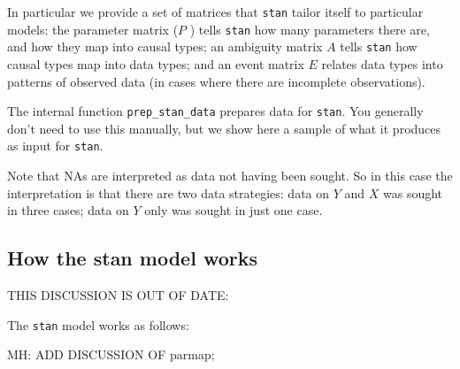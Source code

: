 \documentclass[
  article]{jss}
\begin{document}
In particular we provide a set of matrices that \texttt{stan} tailor
itself to particular models: the parameter matrix (\(P\) ) tells
\texttt{stan} how many parameters there are, and how they map into
causal types; an ambiguity matrix \(A\) tells \texttt{stan} how causal
types map into data types; and an event matrix \(E\) relates data types
into patterns of observed data (in cases where there are incomplete
observations).

The internal function \texttt{prep\_stan\_data} prepares data for
\texttt{stan}. You generally don't need to use this manually, but we
show here a sample of what it produces as input for \texttt{stan}.

Note that NAs are interpreted as data not having been sought. So in this
case the interpretation is that there are two data strategies: data on
\(Y\) and \(X\) was sought in three cases; data on \(Y\) only was sought
in just one case.

\hypertarget{how-the-stan-model-works}{%
\subsection{How the stan model works}\label{how-the-stan-model-works}}

THIS DISCUSSION IS OUT OF DATE:

The \texttt{stan} model works as follows:

MH: ADD DISCUSSION OF parmap;
\end{document}
